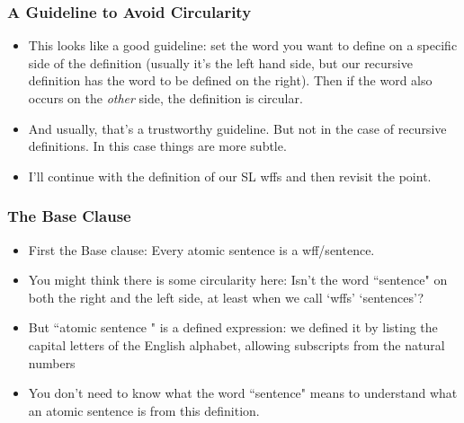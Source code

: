  \begin{frame}
\frametitle{A Guideline to Avoid Circularity}

\begin{itemize}[<+->]
\item This looks like a good guideline: set the word you want to define on a specific side of the definition (usually it's the left hand side, but our recursive definition has the word to be defined on the right). Then if the word also occurs on the {\it{other}} side, the definition is circular.

\item And usually, that's a trustworthy guideline. But not in the case of recursive definitions. In this case things are more subtle.

\item I'll continue with the definition of our SL wffs and then revisit the point.



\end{itemize} 
\end{frame}

 \begin{frame}
\frametitle{The Base Clause}

\begin{itemize}[<+->]
\item First the Base clause: Every atomic sentence is a wff/sentence. 

\item You might think there is some circularity here: Isn't the word ``sentence" on both the right and the left side, at least when we call `wffs' `sentences'? 

\item But ``atomic sentence " is a defined expression: we defined it by listing the capital letters of the English alphabet, allowing subscripts from the natural numbers

\item You don't need to know what the word ``sentence" means to understand what an atomic sentence is from this definition.


\end{itemize} 
\end{frame}

